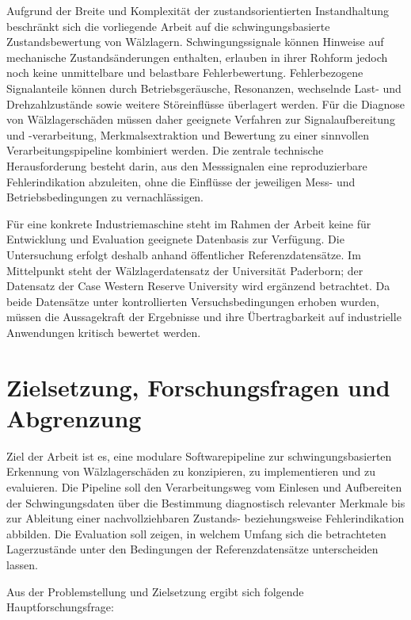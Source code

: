 Aufgrund der Breite und Komplexität der zustandsorientierten Instandhaltung
beschränkt sich die vorliegende Arbeit
auf die schwingungsbasierte Zustandsbewertung von Wälzlagern.
Schwingungssignale können Hinweise auf mechanische Zustandsänderungen enthalten,
erlauben in ihrer Rohform jedoch noch keine unmittelbare und belastbare Fehlerbewertung.
Fehlerbezogene Signalanteile können durch Betriebsgeräusche, Resonanzen,
wechselnde Last- und Drehzahlzustände sowie weitere Störeinflüsse überlagert werden.
Für die Diagnose von Wälzlagerschäden müssen daher geeignete Verfahren zur Signalaufbereitung und -verarbeitung,
Merkmalsextraktion und Bewertung zu einer sinnvollen Verarbeitungspipeline kombiniert werden.
Die zentrale technische Herausforderung besteht darin,
aus den Messsignalen eine reproduzierbare Fehlerindikation abzuleiten,
ohne die Einflüsse der jeweiligen Mess- und Betriebsbedingungen zu vernachlässigen.

Für eine konkrete Industriemaschine steht im Rahmen der Arbeit
keine für Entwicklung und Evaluation geeignete Datenbasis zur Verfügung.
Die Untersuchung erfolgt deshalb anhand öffentlicher Referenzdatensätze.
Im Mittelpunkt steht der Wälzlagerdatensatz der Universität Paderborn;
der Datensatz der Case Western Reserve University wird ergänzend betrachtet.
Da beide Datensätze unter kontrollierten Versuchsbedingungen erhoben wurden,
müssen die Aussagekraft der Ergebnisse und ihre Übertragbarkeit
auf industrielle Anwendungen kritisch bewertet werden.


\section{Zielsetzung, Forschungsfragen und Abgrenzung}
\label{sec:zielsetzung}


Ziel der Arbeit ist es, eine modulare Softwarepipeline zur schwingungsbasierten Erkennung
von Wälzlagerschäden zu konzipieren, zu implementieren und zu evaluieren.
Die Pipeline soll den Verarbeitungsweg vom Einlesen und Aufbereiten der Schwingungsdaten
über die Bestimmung diagnostisch relevanter Merkmale bis zur Ableitung
einer nachvollziehbaren Zustands- beziehungsweise Fehlerindikation abbilden.
Die Evaluation soll zeigen, in welchem Umfang sich die betrachteten Lagerzustände
unter den Bedingungen der Referenzdatensätze unterscheiden lassen.


Aus der Problemstellung und Zielsetzung ergibt sich folgende Hauptforschungsfrage:

